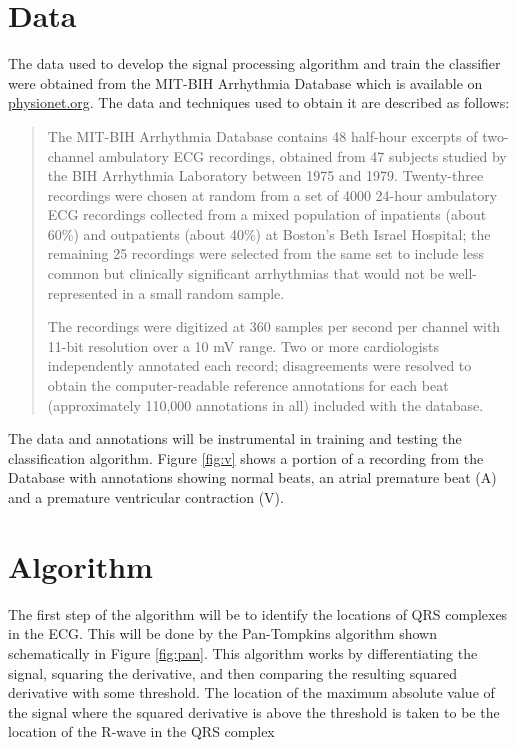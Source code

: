 \documentclass[12pt,letter]{article}
\begin{document}
\section{Data}
The data used to develop the signal processing algorithm and train the
classifier were obtained from the MIT-BIH Arrhythmia Database which is available
on \url{physionet.org}.  The data and techniques used to obtain it are described
as follows: 
\begin{quotation}
     The MIT-BIH Arrhythmia Database contains 48 half-hour excerpts of
     two-channel ambulatory ECG recordings, obtained from 47 subjects studied by
     the BIH Arrhythmia Laboratory between 1975 and 1979. Twenty-three
     recordings were chosen at random from a set of 4000 24-hour ambulatory ECG
     recordings collected from a mixed population of inpatients (about 60\%) and
     outpatients (about 40\%) at Boston's Beth Israel Hospital; the remaining 25
     recordings were selected from the same set to include less common but
     clinically significant arrhythmias that would not be well-represented in a
     small random sample.

     The recordings were digitized at 360 samples per second per channel with
     11-bit resolution over a 10 mV range. Two or more cardiologists
     independently annotated each record; disagreements were resolved to obtain
     the computer-readable reference annotations for each beat (approximately
     110,000 annotations in all) included with the database.
\end{quotation}

The data and annotations will be instrumental in training and testing the
classification algorithm.  Figure \ref{fig:v} shows a portion of a recording
from the Database with annotations showing normal beats, an atrial premature
beat (A) and a premature ventricular contraction (V).  

\section{Algorithm}
The first step of the algorithm will be to identify the locations of QRS
complexes in the ECG.  This will be done by the Pan-Tompkins algorithm shown
schematically in Figure \ref{fig:pan}.  This algorithm works by differentiating
the signal, squaring the derivative, and then comparing the resulting squared
derivative with some threshold.  The location of the maximum absolute value of
the signal where the squared derivative is above the threshold is taken to be
the location of the R-wave in the QRS complex \cite{pan-tompkins85}
\end{document}
